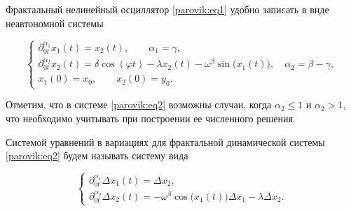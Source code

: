 \smallskip



Фрактальный нелинейный осциллятор \eqref{parovik:eq1} удобно записать в виде неавтономной системы

\begin{equation}

\left\{ \begin{array}{l}

\partial _{0t}^{{\alpha _1}}{x_1}( t ) = {x_2} ( t ), \qquad { \alpha _1} = \gamma, \\[2mm]

\partial _{0t}^{{\alpha _2}}{x_2}( t ) = \delta \cos \left( {\varphi t} \right) - \lambda {x_2}( t ) - {\omega ^\beta }\sin \bigl( {{x_1}( t )} \bigr), \quad {\alpha _2} = \beta  - \gamma, \\[2mm]

{x_1}( 0 ) = {x_0}, \qquad {x_2}( 0 ) = {y_0}.

\end{array} \right.

\label{parovik:eq2}

\end{equation}



\smallskip



\begin{remark}

Отметим, что в системе \eqref{parovik:eq2} возможны случаи, когда ${\alpha_2} \le 1$ и ${\alpha _2} > 1$, что необходимо учитывать при построении ее численного решения.

\end{remark}



\smallskip



\begin{definition}

Системой уравнений в вариациях для фрактальной динамической системы \eqref{parovik:eq2} будем называть  систему вида

\begin{equation}

\left\{ \begin{array}{l}

\partial _{0t}^{{\alpha _1}}\Delta {x_1}( t ) = \Delta {x_2},\\[2mm]

\partial _{0t}^{{\alpha _2}}\Delta {x_2}( t ) =  - {\omega ^\beta}\cos \bigl( {{x_1}( t )} \bigr)\Delta {x_1} - \lambda \Delta {x_2}.

\end{array} \right.

\label{parovik:eq3}

\end{equation}

\end{definition}



